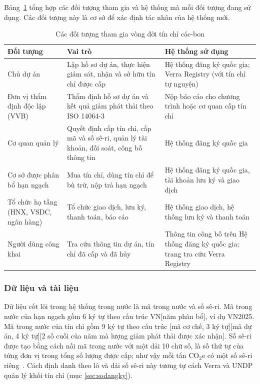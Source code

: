 Bảng~\ref{tab:ks-tacnhan} tổng hợp các đối tượng tham gia và hệ thống mà mỗi đối tượng đang sử dụng. Các đối tượng này là cơ sở để xác định tác nhân của hệ thống mới.

\begin{table}[htbp]
    \centering
    \caption{Các đối tượng tham gia vòng đời tín chỉ các-bon}
    \label{tab:ks-tacnhan}
    \small
    \renewcommand{\arraystretch}{1.2}
    \begin{tabularx}{\textwidth}{|p{3.3cm}|X|p{3.6cm}|}
        \hline
        \textbf{Đối tượng} & \textbf{Vai trò} & \textbf{Hệ thống sử dụng} \\
        \hline
        Chủ dự án & Lập hồ sơ dự án, thực hiện giám sát, nhận và sở hữu tín chỉ được cấp & Hệ thống đăng ký quốc gia; Verra Registry (với tín chỉ tự nguyện) \\
        \hline
        Đơn vị thẩm định độc lập (VVB) & Thẩm định hồ sơ dự án và kết quả giảm phát thải theo ISO 14064-3~\cite{iso14064-3} & Nộp báo cáo cho chương trình hoặc cơ quan cấp tín chỉ \\
        \hline
        Cơ quan quản lý & Quyết định cấp tín chỉ, cấp mã và số sê-ri, quản lý tài khoản, đối soát, công bố thông tin & Hệ thống đăng ký quốc gia \\
        \hline
        Cơ sở được phân bổ hạn ngạch & Mua tín chỉ, dùng tín chỉ để bù trừ, nộp trả hạn ngạch & Hệ thống đăng ký quốc gia, tài khoản lưu ký và giao dịch \\
        \hline
        Tổ chức hạ tầng (HNX, VSDC, ngân hàng) & Tổ chức giao dịch, lưu ký, thanh toán, báo cáo & Hệ thống giao dịch, hệ thống lưu ký và thanh toán \\
        \hline
        Người dùng công khai & Tra cứu thông tin dự án, tín chỉ đã cấp và đã hủy & Thông tin công bố trên Hệ thống đăng ký quốc gia; trang tra cứu Verra Registry \\
        \hline
    \end{tabularx}
\end{table}

\subsubsection*{Dữ liệu và tài liệu}

Dữ liệu cốt lõi trong hệ thống trong nước là mã trong nước và số sê-ri. Mã trong nước của hạn ngạch gồm 6 ký tự theo cấu trúc VN[năm phân bổ], ví dụ VN2025. Mã trong nước của tín chỉ gồm 9 ký tự theo cấu trúc [mã cơ chế, 3 ký tự][mã dự án, 4 ký tự][2 số cuối của năm mà lượng giảm phát thải được xác nhận]. Số sê-ri được tạo bằng cách nối mã trong nước với một dải 10 chữ số, là số thứ tự của từng đơn vị trong tổng số lượng được cấp; như vậy mỗi tấn CO$_2$e có một số sê-ri riêng~\cite{vietnam2026thongtu11}. Cách định danh theo lô và dải số sê-ri này tương tự cách Verra và UNDP quản lý khối tín chỉ (mục \ref{sec:sodangky}).

